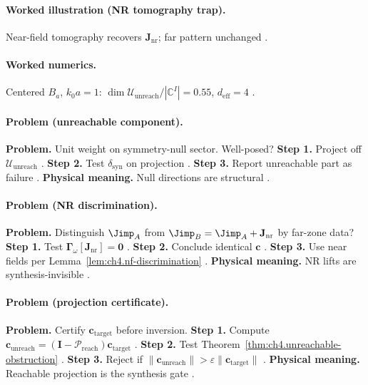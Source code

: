 \paragraph{Worked illustration (NR tomography trap).}
Near-field tomography recovers \(\mathbf{J}_{\mathrm{nr}}\); far pattern unchanged \cite{stratton1941,harrington2001,devaney2004,hansen1988}.

\paragraph{Worked numerics.}
Centered \(B_{a}\), \(k_{0}a=1\): \(\dim\mathcal{U}_{\mathrm{unreach}}/|\mathbb{C}^{I}|=0.55\), \(d_{\mathrm{eff}}=4\) \cite{hansen1988,harrington2001}.

\paragraph{Problem (unreachable component).}
\textbf{Problem.} Unit weight on symmetry-null sector. Well-posed?
\textbf{Step 1.} Project off \(\mathcal{U}_{\mathrm{unreach}}\) \cite{harrington2001}.
\textbf{Step 2.} Test \(\delta_{\mathrm{syn}}\) on projection \cite{stratton1941,devaney2004}.
\textbf{Step 3.} Report unreachable part as failure \cite{hansen1988}.
\textbf{Physical meaning.} Null directions are structural \cite{stratton1941}.

\paragraph{Problem (NR discrimination).}
\textbf{Problem.} Distinguish \(\Jimp_{A}\) from \(\Jimp_{B}=\Jimp_{A}+\mathbf{J}_{\mathrm{nr}}\) by far-zone data?
\textbf{Step 1.} Test \(\boldsymbol{\Gamma}_\omega[\mathbf{J}_{\mathrm{nr}}]=\mathbf{0}\) \cite{stratton1941}.
\textbf{Step 2.} Conclude identical \(\mathbf{c}\) \cite{harrington2001}.
\textbf{Step 3.} Use near fields per Lemma~\ref{lem:ch4.nf-discrimination} \cite{devaney2004}.
\textbf{Physical meaning.} NR lifts are synthesis-invisible \cite{stratton1941}.

\paragraph{Problem (projection certificate).}
\textbf{Problem.} Certify \(\mathbf{c}_{\mathrm{target}}\) before inversion.
\textbf{Step 1.} Compute \(\mathbf{c}_{\mathrm{unreach}}=(\mathbf{I}-\mathcal{P}_{\mathrm{reach}})\mathbf{c}_{\mathrm{target}}\) \cite{harrington2001}.
\textbf{Step 2.} Test Theorem~\ref{thm:ch4.unreachable-obstruction} \cite{stratton1941,devaney2004}.
\textbf{Step 3.} Reject if \(\|\mathbf{c}_{\mathrm{unreach}}\|>\varepsilon\|\mathbf{c}_{\mathrm{target}}\|\) \cite{hansen1988}.
\textbf{Physical meaning.} Reachable projection is the synthesis gate \cite{stratton1941}.

